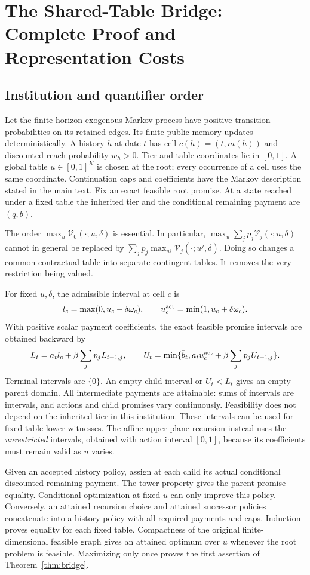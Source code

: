 \section{The Shared-Table Bridge: Complete Proof and Representation Costs}\label{ec:bridge}
\subsection{Institution and quantifier order}
Let the finite-horizon exogenous Markov process have positive transition probabilities on its retained edges. Its finite public memory updates deterministically. A history $h$ at date $t$ has cell $c(h)=(t,m(h))$ and discounted reach probability $w_h>0$. Tier and table coordinates lie in $[0,1]$. A global table $u\in[0,1]^K$ is chosen at the root; every occurrence of a cell uses the same coordinate. Continuation caps and coefficients have the Markov description stated in the main text. Fix an exact feasible root promise. At a state reached under a fixed table the inherited tier and the conditional remaining payment are $(q,b)$.

The order $\max_u\mathcal V_0(\cdot;u,\delta)$ is essential. In particular, $\max_u\sum_jp_j\mathcal V_j(\cdot;u,\delta)$ cannot in general be replaced by $\sum_jp_j\max_{u^j}\mathcal V_j(\cdot;u^j,\delta)$. Doing so changes a common contractual table into separate contingent tables. It removes the very restriction being valued.

For fixed $u,\delta$, the admissible interval at cell $c$ is
\[
 l_c=\max(0,u_c-\delta\omega_c),\qquad
 u_c^{\rm act}=\min(1,u_c+\delta\omega_c).
\]
With positive scalar payment coefficients, the exact feasible promise intervals are obtained backward by
\[
 L_t=a_t l_c+\beta\sum_jp_jL_{t+1,j},\qquad
 U_t=\min\{\bar b_t,a_tu_c^{\rm act}+\beta\sum_jp_jU_{t+1,j}\}.
\]
Terminal intervals are $\{0\}$. An empty child interval or $U_t<L_t$ gives an empty parent domain. All intermediate payments are attainable: sums of intervals are intervals, and actions and child promises vary continuously. Feasibility does not depend on the inherited tier in this institution. These intervals can be used for fixed-table lower witnesses. The affine upper-plane recursion instead uses the \emph{unrestricted} intervals, obtained with action interval $[0,1]$, because its coefficients must remain valid as $u$ varies.

Given an accepted history policy, assign at each child its actual conditional discounted remaining payment. The tower property gives the parent promise equality. Conditional optimization at fixed $u$ can only improve this policy. Conversely, an attained recursion choice and attained successor policies concatenate into a history policy with all required payments and caps. Induction proves equality for each fixed table. Compactness of the original finite-dimensional feasible graph gives an attained optimum over $u$ whenever the root problem is feasible. Maximizing only once proves the first assertion of Theorem~\ref{thm:bridge}.

